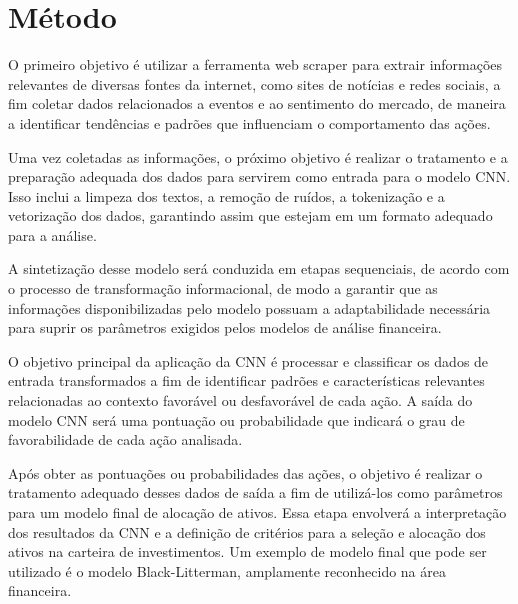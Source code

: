 \chapter{Método}

O primeiro objetivo é utilizar a ferramenta web scraper para extrair informações relevantes de diversas fontes da internet, como sites de notícias e redes sociais, a fim coletar dados relacionados a eventos e ao sentimento do mercado, de maneira a identificar tendências e padrões que influenciam o comportamento das ações. 

Uma vez coletadas as informações, o próximo objetivo é realizar o tratamento e a preparação adequada dos dados para servirem como entrada para o modelo CNN. Isso inclui a limpeza dos textos, a remoção de ruídos, a tokenização e a vetorização dos dados, garantindo assim que estejam em um formato adequado para a análise.

A sintetização desse modelo será conduzida em etapas sequenciais, de acordo com o processo de transformação informacional, de modo a garantir que as informações disponibilizadas pelo modelo possuam a adaptabilidade necessária para suprir os parâmetros exigidos pelos modelos de análise financeira.

O objetivo principal da aplicação da CNN é processar e classificar os dados de entrada transformados a fim de identificar padrões e características relevantes relacionadas ao contexto favorável ou desfavorável de cada ação. A saída do modelo CNN será uma pontuação ou probabilidade que indicará o grau de favorabilidade de cada ação analisada.

Após obter as pontuações ou probabilidades das ações, o objetivo é realizar o tratamento adequado desses dados de saída a fim de utilizá-los como parâmetros para um modelo final de alocação de ativos. Essa etapa envolverá a interpretação dos resultados da CNN e a definição de critérios para a seleção e alocação dos ativos na carteira de investimentos. Um exemplo de modelo final que pode ser utilizado é o modelo Black-Litterman, amplamente reconhecido na área financeira.

